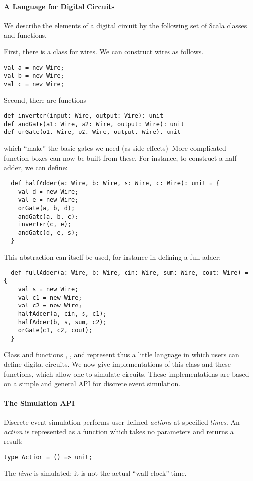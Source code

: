 \documentclass[a4paper,12pt,twoside,titlepage]{book}
\begin{document}
{\paragraph{A Language for Digital Circuits}

We describe the elements of a digital circuit by the following set of
Scala classes and functions.

First, there is a class  for wires.
We can construct wires as follows.
\begin{lstlisting}
val a = new Wire;
val b = new Wire;
val c = new Wire;
\end{lstlisting}
Second, there are functions
\begin{lstlisting}
def inverter(input: Wire, output: Wire): unit
def andGate(a1: Wire, a2: Wire, output: Wire): unit
def orGate(o1: Wire, o2: Wire, output: Wire): unit
\end{lstlisting}
which ``make'' the basic gates we need (as side-effects).
More complicated function boxes can now be built from these.
For instance, to construct a half-adder, we can define:

\begin{lstlisting}
  def halfAdder(a: Wire, b: Wire, s: Wire, c: Wire): unit = {
    val d = new Wire;
    val e = new Wire;
    orGate(a, b, d);
    andGate(a, b, c);
    inverter(c, e);
    andGate(d, e, s);
  }
\end{lstlisting}
This abstraction can itself be used, for instance in defining a full
adder:
\begin{lstlisting}
  def fullAdder(a: Wire, b: Wire, cin: Wire, sum: Wire, cout: Wire) = {
    val s = new Wire;
    val c1 = new Wire;
    val c2 = new Wire;
    halfAdder(a, cin, s, c1);
    halfAdder(b, s, sum, c2);
    orGate(c1, c2, cout);
  }
\end{lstlisting}
Class  and functions , , and
 represent thus a little language in which users can
define digital circuits.  We now give implementations of this class
and these functions, which allow one to simulate circuits.
These implementations are based on a simple and general API for
discrete event simulation.

\paragraph{The Simulation API}

Discrete event simulation performs user-defined \emph{actions} at
specified \emph{times}.  
An {\em action} is represented as a function which takes no parameters and
returns a  result:
\begin{lstlisting}
type Action = () => unit;
\end{lstlisting}
The \emph{time} is simulated; it is not the actual ``wall-clock'' time.

}
\end{document}
